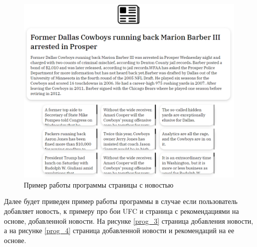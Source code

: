 \begin{figure}[H]
	\centering
	\includegraphics[width=\textwidth]{img/prog_2.pdf}
	\caption{Пример работы программы страницы с новостью}
	\label{prog_2}
\end{figure}  

Далее будет приведен пример работы программы в случае если пользователь добавляет новость, к примеру про бои UFC и страница с рекомендациями на основе, добавленной новости. На рисунке \ref{prog_3} страница добавления новости, а на рисунке \ref{prog_4} страница добавленной новости и рекомендаций на ее основе.

